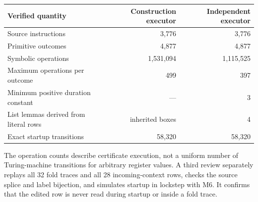 \begin{center}\small
\begin{tabular}{@{}lrr@{}}\toprule
Verified quantity & Construction executor & Independent executor\\\midrule
Source instructions & 3,776 & 3,776\\
Primitive outcomes & 4,877 & 4,877\\
Symbolic operations & 1,531,094 & 1,115,525\\
Maximum operations per outcome & 499 & 397\\
Minimum positive duration constant & --- & 3\\
List lemmas derived from literal rows & inherited boxes & 4\\
Exact startup transitions & 58,320 & 58,320\\\bottomrule
\end{tabular}
\end{center}
The operation counts describe certificate execution, not a uniform number
of Turing-machine transitions for arbitrary register values. A third review
separately replays all 32 fold traces and all 28 incoming-context rows,
checks the source splice and label bijection, and simulates startup in
lockstep with M6. It confirms that the edited row is never read during
startup or inside a fold trace.
